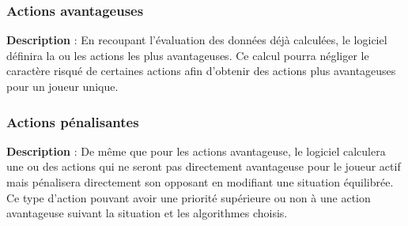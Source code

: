 			\subsubsection{Actions avantageuses}
			
			\textbf{Description} : En recoupant l'évaluation des données déjà calculées, le logiciel définira la ou les actions les plus avantageuses. Ce calcul pourra négliger le caractère risqué de certaines actions afin d'obtenir des actions plus avantageuses pour un joueur unique.
			
			\subsubsection{Actions pénalisantes}
			
			\textbf{Description} : De même que pour les actions avantageuse, le logiciel calculera une ou des actions qui ne seront pas directement avantageuse pour le joueur actif mais pénalisera directement son opposant en modifiant une situation équilibrée. Ce type d'action pouvant avoir une priorité supérieure ou non à une action avantageuse suivant la situation et les algorithmes choisis.
   
	\clearpage
